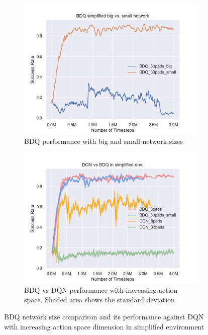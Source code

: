 \begin{figure}[!htbp]
    \begin{subfigure}{0.49\textwidth}
        \includegraphics[width=\linewidth]{figures/BDQ_simplified_big_vs_small_network_no_var}
        \caption{BDQ performance with big and small network sizes} \label{fig:BDQnetwork}
    \end{subfigure}%
    \hspace*{\fill}   %
    \begin{subfigure}{0.49\textwidth}
        \includegraphics[width=\linewidth]{figures/DQN_vs_BDQ_in_simplified_env}
        \caption{BDQ vs DQN performance with increasing action space. Shaded area shows the standard deviation} \label{fig:BDQDQNsimp}
    \end{subfigure}%
    \hspace*{\fill}   %
\caption{ BDQ network size comparison and its performance against DQN with increasing action space dimension in simplified environment\label{fig:BDQDQN}}
\end{figure}


